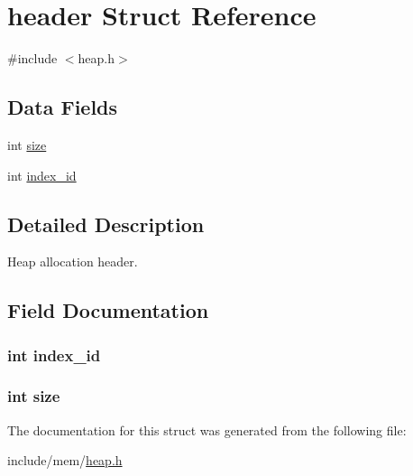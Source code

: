 \hypertarget{structheader}{}\section{header Struct Reference}
\label{structheader}


{\ttfamily \#include $<$heap.\+h$>$}

\subsection*{Data Fields}
\begin{DoxyCompactItemize}
\item 
int \hyperlink{structheader_a439227feff9d7f55384e8780cfc2eb82}{size}
\item 
int \hyperlink{structheader_af535dc35cc74e67b62de5a0a3540becd}{index\+\_\+id}
\end{DoxyCompactItemize}


\subsection{Detailed Description}
Heap allocation header. 

\subsection{Field Documentation}
\subsubsection[{\texorpdfstring{index\+\_\+id}{index_id}}]{\setlength{\rightskip}{0pt plus 5cm}int index\+\_\+id}\hypertarget{structheader_af535dc35cc74e67b62de5a0a3540becd}{}\label{structheader_af535dc35cc74e67b62de5a0a3540becd}
\subsubsection[{\texorpdfstring{size}{size}}]{\setlength{\rightskip}{0pt plus 5cm}int size}\hypertarget{structheader_a439227feff9d7f55384e8780cfc2eb82}{}\label{structheader_a439227feff9d7f55384e8780cfc2eb82}


The documentation for this struct was generated from the following file\+:\begin{DoxyCompactItemize}
\item 
include/mem/\hyperlink{heap_8h}{heap.\+h}\end{DoxyCompactItemize}

